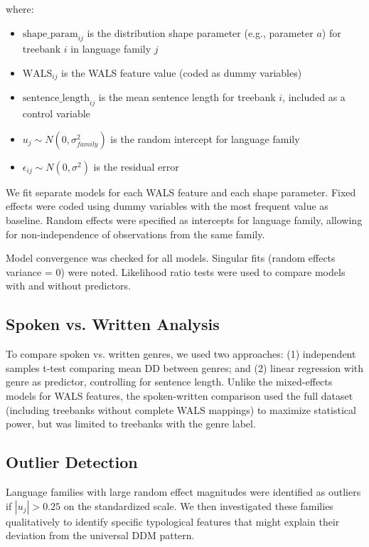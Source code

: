 \documentclass[11pt,letterpaper]{article}
\begin{document}
where:
\begin{itemize}
  \item $\text{shape\_param}_{ij}$ is the distribution shape parameter (e.g., parameter $a$) for treebank $i$ in language family $j$
  \item $\text{WALS}_{ij}$ is the WALS feature value (coded as dummy variables)
  \item $\text{sentence\_length}_{ij}$ is the mean sentence length for treebank $i$, included as a control variable
  \item $u_j \sim N(0, \sigma^2_{family})$ is the random intercept for language family
  \item $\epsilon_{ij} \sim N(0, \sigma^2)$ is the residual error
\end{itemize}

We fit separate models for each WALS feature and each shape parameter. Fixed effects were coded using dummy variables with the most frequent value as baseline. Random effects were specified as intercepts for language family, allowing for non-independence of observations from the same family.

Model convergence was checked for all models. Singular fits (random effects variance = 0) were noted. Likelihood ratio tests were used to compare models with and without predictors.

\subsection{Spoken vs. Written Analysis}

To compare spoken vs. written genres, we used two approaches: (1) independent samples t-test comparing mean DD between genres; and (2) linear regression with genre as predictor, controlling for sentence length. Unlike the mixed-effects models for WALS features, the spoken-written comparison used the full dataset (including treebanks without complete WALS mappings) to maximize statistical power, but was limited to treebanks with the genre label.

\subsection{Outlier Detection}

Language families with large random effect magnitudes were identified as outliers if $|u_j| > 0.25$ on the standardized scale. We then investigated these families qualitatively to identify specific typological features that might explain their deviation from the universal DDM pattern.
\end{document}
